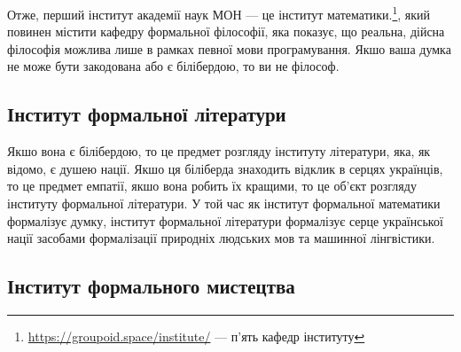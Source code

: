 Отже, перший інститут академії наук МОН --- це інститут
математики.\footnote{ \url{https://groupoid.space/institute/} --- п'ять кафедр інституту}, який повинен містити кафедру формальної філософії,
яка показує, що реальна, дійсна філософія можлива лише в рамках певної мови програмування.
Якшо ваша думка не може бути закодована або є білібердою, то ви не філософ.

\subsection{Інститут формальної літератури}

Якшо вона є білібердою, то це предмет розгляду інституту літератури, яка, як відомо, є душею
нації. Якшо ця біліберда знаходить відклик в серцях українців, то це предмет емпатії, якшо
вона робить їх кращими, то це об'єкт розгляду інституту формальної літератури. У той час
як інститут формальної математики формалізує думку, інститут формальної літератури
формалізує серце української нації засобами формалізації природніх людських мов та
машинної лінгвістики.

\subsection{Інститут формального мистецтва}

